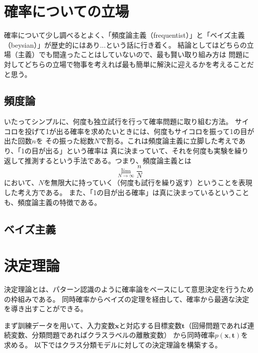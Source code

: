 \documentclass[a4j,twocolumn, uplatex]{jsarticle}
\begin{document}
\section{確率についての立場}

確率について少し調べるとよく、「頻度論主義（frequentist）」と「ベイズ主義（beysian）」が歴史的にはあり...という話に行き着く。
結論としてはどちらの立場（主義）でも間違ったことはしていないので、最も賢い取り組み方は
問題に対してどちらの立場で物事を考えれば最も簡単に解決に迎えるかを考えることだと思う。

\subsection{頻度論}

いたってシンプルに、何度も独立試行を行って確率問題に取り組む方法。
サイコロを投げて1が出る確率を求めたいときには、何度もサイコロを振って1の目が出た回数$n$を
その振った総数$N$で割る。これは頻度論主義に立脚した考えであり、「1の目が出る」という確率は
真に決まっていて、それを何度も実験を繰り返して推測するという手法である。つまり、頻度論主義とは
\begin{equation}
  \lim_{N\to\infty} \frac{n}{N}
\end{equation}
において、$N$を無限大に持っていく（何度も試行を繰り返す）ということを表現した考え方である。
また、「1の目が出る確率」は真に決まっているということも、頻度論主義の特徴である。

\subsection{ベイズ主義}


\section{決定理論}
決定理論とは、パターン認識のように確率論をベースにして意思決定を行うための枠組みである。
同時確率からベイズの定理を経由して、確率から最適な決定を導き出すことができる。

まず訓練データを用いて、入力変数$\bm{x}$と対応する目標変数$\bm{t}$（回帰問題であれば連続変数、分類問題であればクラスラベルの離散変数）
から同時確率$p(\bm{x},\bm{t})$を求める。
以下ではクラス分類モデルに対しての決定理論を構築する。
\end{document}

